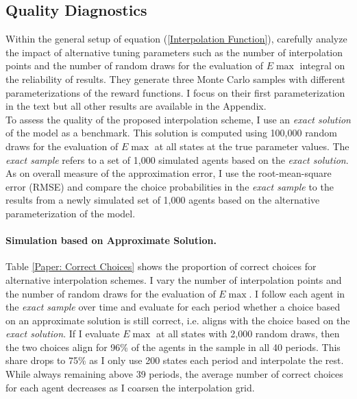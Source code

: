 \subsection{Quality Diagnostics}
Within the general setup of equation (\ref{Interpolation Function}), \citet{Keane.1994} carefully analyze the impact of alternative tuning parameters such as the number of interpolation points and the number of random draws for the evaluation of $E\max$ integral on the reliability of results. They generate three Monte Carlo samples with different parameterizations of the reward functions. I focus on their first parameterization in the text but all other results are available in the Appendix.\\\newline
%
To assess the quality of the proposed interpolation scheme, I use an \textit{exact solution} of the model as a benchmark. This solution is computed using 100,000 random draws for the evaluation of $E\max$ at all states at the true parameter values. The \textit{exact sample} refers to a set of 1,000 simulated agents based on the \textit{exact solution}. As on overall measure of the approximation error, I use the root-mean-square error (RMSE) and compare the choice probabilities in the \textit{exact sample} to the results from a newly simulated set of 1,000 agents based on the alternative parameterization of the model.
\paragraph{Simulation based on Approximate Solution.}
Table \ref{Paper: Correct Choices} shows the proportion of correct choices for alternative interpolation schemes. I vary the number of interpolation points and the number of random draws for the evaluation of $E\max$. I follow each agent in the \textit{exact sample} over time and evaluate for each period whether a choice based on an approximate solution is still correct, i.e. aligns with the choice based on the \textit{exact solution}. If I evaluate $E\max$ at all states with 2,000 random draws, then the two choices align for 96\% of the agents in the sample in all 40 periods. This share drops to 75\% as I only use 200 states each period and interpolate the rest. While always remaining above 39 periods, the average number of correct choices for each agent decreases as I coarsen the interpolation grid.

